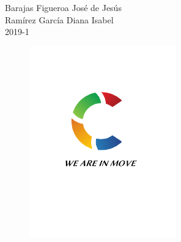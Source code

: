 \documentclass{article}
\begin{document}
\begin{titlepage}
\begin{center}
\begin{center}
Barajas Figueroa José de Jesús\\
Ramírez García Diana Isabel\\
\vspace*{.3in}
2019-1 \\%
\begin{figure}[H]
\begin{center}
\includegraphics[width=2.5in]{./img/logo.png}
\end{center}
\end{figure}
\end{center}
\end{center}
\end{titlepage}
\end{document}
